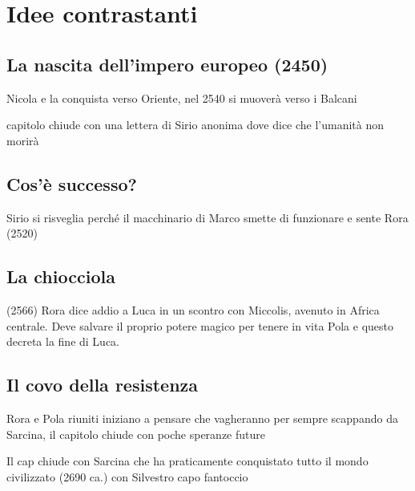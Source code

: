 
\chapter{Idee contrastanti}

\section{La nascita dell'impero europeo (2450)}
Nicola e la conquista verso Oriente, nel 2540 si muoverà verso i Balcani

capitolo chiude con una lettera di Sirio anonima dove dice che l'umanità non morirà

\section{Cos'è successo?}
Sirio si risveglia perché il macchinario di Marco smette di funzionare e sente Rora (2520)

\section{La chiocciola}
(2566) Rora dice addio a Luca in un scontro con Miccolis, avenuto in Africa centrale. Deve salvare il proprio potere magico per tenere in vita Pola e questo decreta la fine di Luca.

\section{Il covo della resistenza}
Rora e Pola riuniti iniziano a pensare che vagheranno per sempre scappando da Sarcina, il capitolo chiude con poche speranze future

Il cap chiude con Sarcina che ha praticamente conquistato tutto il mondo civilizzato (2690 ca.) con Silvestro capo fantoccio
